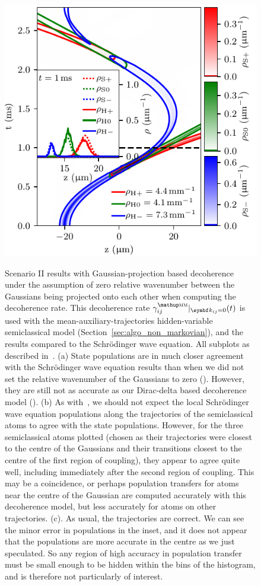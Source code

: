 {\begin{figure}
{    \includegraphics{figures/hidden_variables/hvsc_aux_mirror_bad_gamma/trajectories.pdf}
    }
    \caption{Scenario II results with Gaussian-projection based decoherence under the assumption of zero relative wavenumber between the Gaussians being projected onto each other when computing the decoherence rate. This decoherence rate $\gamma^\up{\textsc{mm}}_{ij}|_{\vec k_{ij} = 0}(t)$ is used with the mean-auxiliary-trajectories hidden-variable semiclassical model (Section~\ref{sec:algo_non_markovian}), and the results compared to the Schr\"odinger wave equation. All subplots as described in~. (a) State populations are in much closer agreement with the Schr\"odinger wave equation results than when we did not set the relative wavenumber of the Gaussians to zero (). However, they are still not as accurate as our Dirac-delta based decoherence model (). (b) As with~, we should not expect the local Schr\"odinger wave equation populations along the trajectories of the semiclassical atoms to agree with the state populations. However, for the three semiclassical atoms plotted (chosen as their trajectories were closest to the centre of the Gaussians and their transitions closest to the centre of the first region of coupling), they appear to agree quite well, including immediately after the second region of coupling. This may be a coincidence, or perhaps population transfers for atoms near the centre of the Gaussian are computed accurately with this decoherence model, but less accurately for atoms on other trajectories. (c). As usual, the trajectories are correct. We can see the minor error in populations in the inset, and it does not appear that the populations are more accurate in the centre as we just speculated. So any region of high accuracy in population transfer must be small enough to be hidden within the bins of the histogram, and is therefore not particularly of interest.}\label{fig:bad_gamma}
\end{figure}
\restoregeometry}

